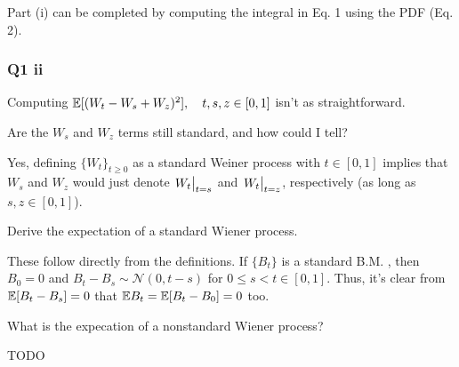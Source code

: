 Part (i) can be completed by computing the integral in Eq. 1 using the PDF (Eq. 2).

\subsubsection*{Q1 ii}

Computing $\mathbb{E}[(W_t - W_s + W_z)^2], \quad t, s, z \in [0, 1]$ isn't as straightforward. 
\begin{quest}
	\item Are the $W_s$ and $W_z$ terms still standard, and how could I tell?
	\begin{ans}
		Yes, defining $\{W_t\}_{t\geq 0}$ as a standard Weiner process with $t\in[0, 1]$ implies that $W_s$ and $W_z$ would just denote  $\eval{W_t}_{t=s}$ and $\eval{W_t}_{t=z}$, respectively (as long as $s, z \in[0, 1]$). 
	\end{ans}
	\item Derive the expectation of a standard Wiener process. 
	\begin{ans}
		These follow directly from the definitions. If $\{B_t\}$ is a standard B.M. , then $B_0 = 0$ and $B_t- B_s \sim \mathcal{N}(0, t-s)$ for $0\leq s <t\in[0, 1]$. Thus, it's clear from $\mathbb{E}[B_t - B_s] = 0$ that $\mathbb{E} B_t = \mathbb{E}[B_t - B_0] = 0$ too.  
	\end{ans}
	\item What is the expecation of a nonstandard Wiener process?
	\begin{ans}
		TODO 
	\end{ans}
\end{quest}

